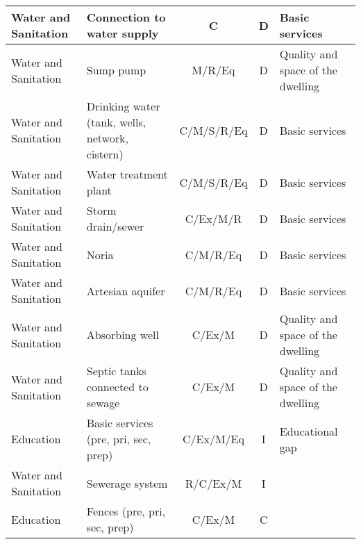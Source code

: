 \begin{tabular}{llccl}
		\vspace{0.1cm}
		Water and Sanitation & Connection to water supply & C & D & Basic services
		\\ 
		\hline
		
		\vspace{0.1cm}
		Water and   Sanitation & Sump pump & M/R/Eq & D & Quality and space of the dwelling
		\\
		\hline
		
		\vspace{0.1cm}
		Water and Sanitation & Drinking water (tank, wells, network, cistern) & C/M/S/R/Eq & D & Basic services
		\\
		\hline
		
		\vspace{0.1cm}
		Water and Sanitation & Water treatment plant & C/M/S/R/Eq & D & Basic services \\ \hline
		Water and Sanitation & Storm drain/sewer & C/Ex/M/R & D & Basic services 
		\\
		\hline
		
		\vspace{0.1cm}
		Water and Sanitation & Noria & C/M/R/Eq & D & Basic services 
		\\ 
		\hline
		
		\vspace{0.1cm}
		Water and Sanitation & Artesian aquifer & C/M/R/Eq & D & Basic services
		\\ 
		\hline
		
		\vspace{0.1cm}
		Water and Sanitation & Absorbing well & C/Ex/M & D & Quality and space of the dwelling
		\\ 
		\hline
		
		\vspace{0.1cm}
		Water and Sanitation & Septic tanks connected to sewage & C/Ex/M & D & Quality and space of the dwelling
		\\ 
		\hline
		
		\vspace{0.1cm}
		Education & Basic services (pre, pri, sec, prep) & C/Ex/M/Eq & I & Educational gap
		\\ 
		\hline
		
		\vspace{0.1cm}
		Water and Sanitation & Sewerage system & R/C/Ex/M & I &
		\\ 
		\hline
		
		\vspace{0.1cm}
		Education & Fences (pre, pri, sec, prep) & C/Ex/M & C &
		\\ 
		\hline
		

\end{tabular}

